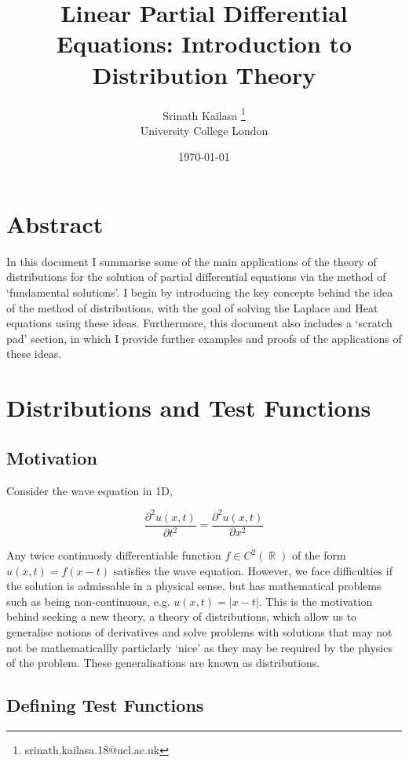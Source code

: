 \documentclass[12pt, a4]{article}
\title{Linear Partial Differential Equations: Introduction to Distribution Theory}
\author{Srinath Kailasa \thanks{srinath.kailasa.18@ucl.ac.uk} \\ \small University College London}
\date{\today}
\DeclareMathOperator\reals{\mathbb{R}}
\begin{document}
\maketitle

\section*{Abstract}

In this document I summarise some of the main applications of the theory of distributions for the solution of partial differential equations via the method of `fundamental solutions'. I begin by introducing the key concepts behind the idea of the method of distributions, with the goal of solving the Laplace and Heat equations using these ideas. Furthermore, this document also includes a `scratch pad' section, in which I provide further examples and proofs of the applications of these ideas.

\section{Distributions and Test Functions}

\subsection{Motivation}

Consider the wave equation in 1D,

\begin{equation}
    \frac{\partial^2u(x, t)}{\partial t^2} = \frac{\partial^2u(x, t)}{\partial x^2}
    \label{eq:wave_eq_1d}
\end{equation}

Any twice continuosly differentiable function $f \in C^2(\reals)$ of the form $u(x, t) = f(x-t)$ satisfies the wave equation. However, we face difficulties if the solution is admissable in a physical sense, but has mathematical problems such as being non-continuous, e.g. $u(x, t) = |x-t|$. This is the motivation behind seeking a new theory, a theory of distributions, which allow us to generalise notions of derivatives and solve problems with solutions that may not not be mathematicallly particlarly `nice' as they may be required by the physics of the problem. These generalisations are known as distributions.

\subsection{Defining Test Functions}
\end{document}
